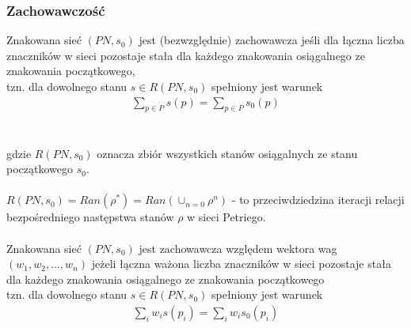 \documentclass[a4paper,15pt]{article}
\newcommand{\definition}[2]{
    \begin{tcolorbox}[colback=green!5!white,colframe=mGreen,title={Definicja -  #1}]
        #2
    \end{tcolorbox}
}
\begin{document}
\subsubsection{Zachowawczość}
\definition{Zachowawczość}{
Znakowana sieć $(PN, s_0)$ jest (bezwzględnie) zachowawcza jeśli dla łączna liczba znaczników w sieci pozostaje stała dla każdego znakowania osiągalnego ze znakowania początkowego, \\ tzn. dla dowolnego stanu $s \in R(PN, s_0)$ spełniony jest warunek 
\begin{align*}
\sum_{p\in P}s(p)=\sum_{p\in P}s_0(p)
\end{align*}
\\ \\
gdzie $R(PN,s_0)$ oznacza zbiór wszystkich stanów osiągalnych ze stanu początkowego $s_0$. \\ \\
$R(PN,s_0) = Ran(\rho ^*) = Ran (\cup_{n=0}\rho ^n)$ - to przeciwdziedzina iteracji relacji bezpośredniego następstwa stanów $\rho$ w sieci Petriego. \\ \\

Znakowana sieć $(PN, s_0)$ jest zachowawcza względem wektora wag $(w_1, w_2, \dots , w_n)$ jeżeli łączna ważona liczba znaczników w sieci pozostaje stała dla każdego znakowania osiągalnego ze znakowania początkowego \\ tzn. dla dowolnego stanu $s \in R(PN, s_0)$ spełniony jest warunek 
\begin{align*}
\sum_{i}^{} w_is(p_i)=\sum_{i}w_is_0(p_i)
\end{align*}
}

\newpage
\end{document}
